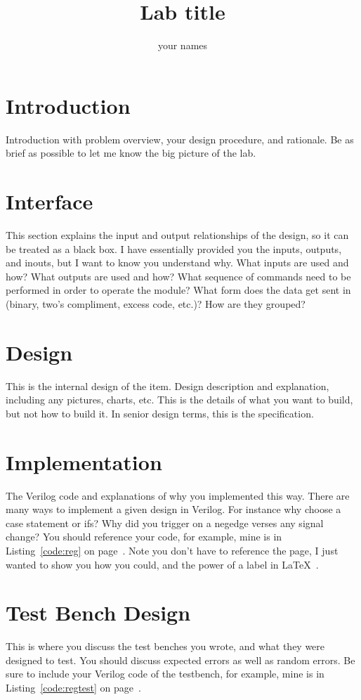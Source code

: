 \documentclass{article}
\author{your names}
\title{Lab title}
\newcommand{\Verilog}[3]{
  \lstset{language=Verilog}
  \lstset{backgroundcolor=\color{listinggray},rulecolor=\color{blue}}
  \lstset{linewidth=\textwidth}
  \lstset{commentstyle=\textit, stringstyle=\upshape,showspaces=false}
  \lstset{frame=tb}
  
}
\begin{document}
\maketitle

\section{Introduction}
Introduction with problem overview, your design procedure, and rationale.  Be as brief as possible to let me know the big picture of the lab.

\section{Interface}
This section explains the input and output relationships of the design, so it can be treated as a black box.  I have essentially provided you the inputs, outputs, and inouts, but I want to know you understand why.  What inputs are used and how?  What outputs are used and how?  What sequence of commands need to be performed in order to operate the module?  What form does the data get sent in (binary, two's compliment, excess code, etc.)?  How are they grouped?

\section{Design}
This is the internal design of the item.  Design description and explanation, including any pictures, charts, etc.  This is the details of what you want to build, but not how to build it.  In senior design terms, this is the specification.

\section{Implementation}
The Verilog code and explanations of why you implemented this way.  There are many ways to implement a given design in Verilog.  For instance why choose a case statement or ifs?  Why did you trigger on a negedge verses any signal change?  You should reference your code, for example, mine is in Listing~\ref{code:reg} on page~\pageref{code:reg}.  Note you don't have to reference the page, I just wanted to show you how you could, and the power of a label in \LaTeX\ .

\Verilog{Verilog code for implementing a register.}{code:reg}{../code/register.v}

\section{Test Bench Design}
This is where you discuss the test benches you wrote, and what they were designed to test.  You should discuss expected errors as well as random errors.  Be sure to include your Verilog code of the testbench, for example, mine is in Listing~\ref{code:regtest} on page~\pageref{code:regtest}.
\end{document}
